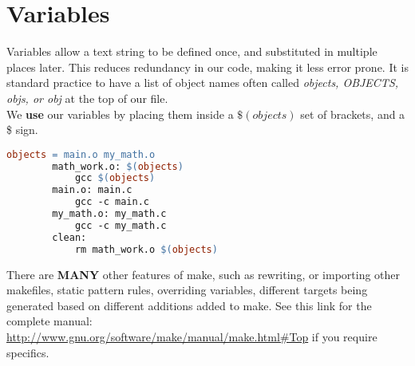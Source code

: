 \documentclass{article}
\begin{document}
	\section*{Variables}
		Variables allow a text string to be defined once, and substituted in multiple places later. This reduces redundancy in our
		code, making it less error prone. It is standard practice to have a list of object names often called \textit{objects,
		OBJECTS, objs, or obj} at the top of our file.\\

		We \textbf{use} our variables by placing them inside a $\$(objects)$ set of brackets, and a \$ sign.
	\begin{lstlisting}[language=make]
		objects = main.o my_math.o
		math_work.o: $(objects)
			gcc $(objects)
		main.o: main.c
			gcc -c main.c
		my_math.o: my_math.c
			gcc -c my_math.c
		clean:
			rm math_work.o $(objects)
	\end{lstlisting}
	There are \textbf{MANY} other features of make, such as rewriting, or importing other makefiles, static pattern rules, 
	overriding variables, different targets being generated based on different additions added to make. See this link for
	the complete manual:\\ \url{http://www.gnu.org/software/make/manual/make.html#Top} if you require specifics.
\end{document}
